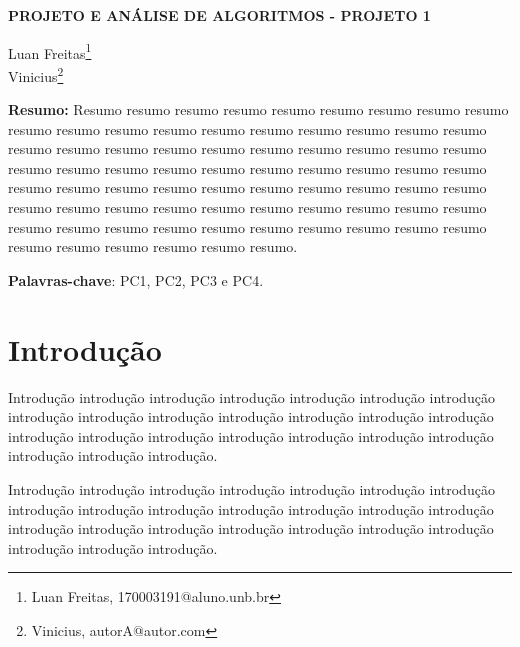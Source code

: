 \documentclass[article,12pt,oneside,a4paper,english,brazil,sumario=tradicional]{abntex2}
\begin{document}
\frenchspacing %

\begin{center}
	\uppercase{\bfseries{Projeto e Análise de Algoritmos - Projeto 1}}
	\vspace{12pt}
\end{center}

\begin{flushright}
	Luan Freitas\footnote{Luan Freitas, 170003191@aluno.unb.br}
	\\
	Vinicius\footnote{Vinicius, autorA@autor.com}
	\vspace{12pt}
\end{flushright}

\begin{footnotesize}
\SingleSpacing
\noindent
\small{\textbf{Resumo:}}
\noindent
\small
Resumo resumo resumo resumo resumo resumo resumo resumo resumo resumo resumo resumo resumo resumo resumo resumo resumo resumo resumo resumo resumo resumo resumo resumo resumo resumo resumo resumo resumo resumo resumo resumo resumo resumo resumo resumo resumo resumo resumo resumo resumo resumo resumo resumo resumo resumo resumo resumo resumo resumo resumo resumo resumo resumo resumo resumo resumo resumo resumo resumo resumo resumo resumo resumo resumo resumo resumo resumo resumo resumo resumo resumo resumo resumo resumo.

\noindent
\textbf{Palavras-chave}: PC1, PC2, PC3 e PC4.
\end{footnotesize}

\textual
\pagestyle{simple}


\section{Introdu\c c\~ao}
\label{secIntroducao}
\normalsize
Introdu\c c\~ao introdu\c c\~ao introdu\c c\~ao introdu\c c\~ao introdu\c c\~ao introdu\c c\~ao introdu\c c\~ao introdu\c c\~ao introdu\c c\~ao introdu\c c\~ao introdu\c c\~ao introdu\c c\~ao introdu\c c\~ao introdu\c c\~ao introdu\c c\~ao introdu\c c\~ao introdu\c c\~ao introdu\c c\~ao introdu\c c\~ao introdu\c c\~ao introdu\c c\~ao introdu\c c\~ao introdu\c c\~ao introdu\c c\~ao.

Introdu\c c\~ao introdu\c c\~ao introdu\c c\~ao introdu\c c\~ao introdu\c c\~ao introdu\c c\~ao introdu\c c\~ao introdu\c c\~ao introdu\c c\~ao introdu\c c\~ao introdu\c c\~ao introdu\c c\~ao introdu\c c\~ao introdu\c c\~ao introdu\c c\~ao introdu\c c\~ao introdu\c c\~ao introdu\c c\~ao introdu\c c\~ao introdu\c c\~ao introdu\c c\~ao introdu\c c\~ao introdu\c c\~ao introdu\c c\~ao.
\end{document}
